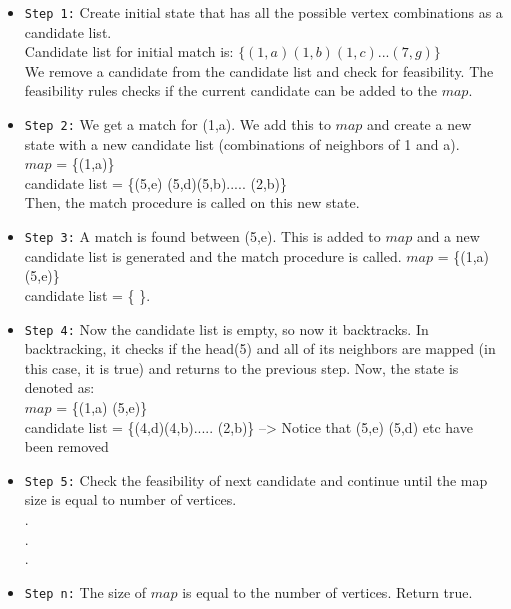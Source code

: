 \begin{itemize}
\item \texttt{Step 1:} Create initial state that has all the possible vertex combinations as a candidate list.\\ 
Candidate list for initial match is:  $\{ (1,a) (1,b) (1,c)... (7,g)\}$ \\
We remove a candidate from the candidate list and check for feasibility. The feasibility rules checks if the current candidate can be added to the $map$.\\

\item \texttt{Step 2:} We get a match for (1,a). We add this to $map$ and create a new state with a new candidate list (combinations of neighbors of 1 and a).\\
$map$ = \{(1,a)\} \\
candidate list = \{(5,e) (5,d)(5,b)..... (2,b)\}\\
Then, the match procedure is called on this new state. 

\item \texttt{Step 3:} A match is found between (5,e). This is added to $map$ and a new candidate list is generated and the match procedure is called. 
$map$ = \{(1,a) (5,e)\}\\
candidate list = \{ \}.

\item \texttt{Step 4:} Now the candidate list is empty, so now it backtracks. In backtracking, it checks if the head(5) and all of its neighbors are mapped (in this case, it is true) and returns to the previous step. Now, the state is denoted as:\\ 
$map$ = \{(1,a) (5,e)\}\\
candidate list = \{(4,d)(4,b)..... (2,b)\} --> Notice that (5,e) (5,d) etc have been removed

\item \texttt{Step 5:} Check the feasibility of next candidate and continue until the map size is equal to number of vertices.\\ 
.\\
.\\
.\\
\item {\texttt{Step n:}} The size of $map$ is equal to the number of vertices. Return true.
\end{itemize}

